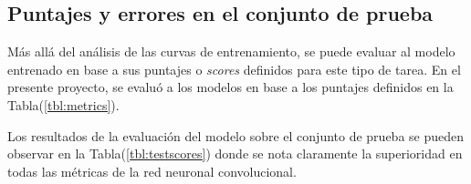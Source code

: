     \subsection{Puntajes y errores en el conjunto de prueba}\label{sec:scores}
    Más allá del análisis de las curvas de entrenamiento, se puede evaluar al modelo entrenado en base a sus puntajes o 
    \textit{scores} definidos para este tipo de tarea. En el presente proyecto, se evaluó a los modelos en base a 
    los puntajes definidos en la Tabla(\ref{tbl:metrics}).


    \begin{table}[!h]
        \centering
        \caption[Métricas para la evaluación del modelo.]{Métricas para la evaluación del modelo. Fuente: Elaboración propia.}
        \label{tbl:metrics}
    \end{table}

    Los resultados de la evaluación del modelo sobre el conjunto de prueba se pueden observar en la Tabla(\ref{tbl:testscores}) donde se 
    nota claramente la superioridad en todas las métricas de la red neuronal convolucional. 

    \begin{table}[!h]
        \centering
        \caption[Evaluación de puntajes sobre el conjunto de prueba.]{Evaluación de puntajes sobre el conjunto de prueba. Fuente: Elaboración propia.}
        \label{tbl:testscores}
    \end{table}

